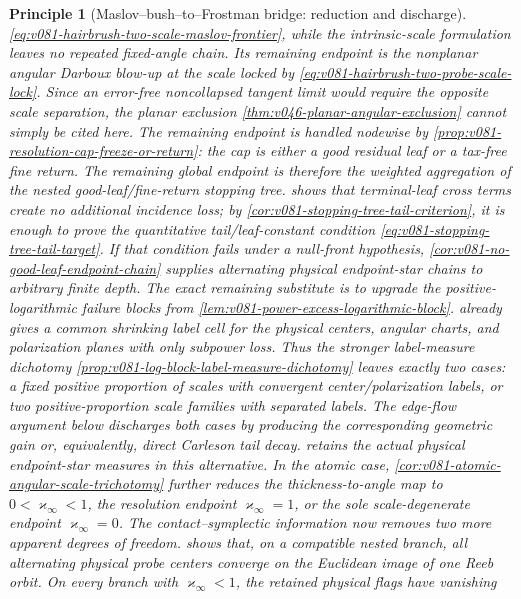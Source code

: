 \documentclass[10pt]{article}
\newtheorem{principle}[theorem]{Principle}
\begin{document}
\begin{principle}[Maslov--bush--to--Frostman bridge: reduction and discharge]
\eqref{eq:v081-hairbrush-two-scale-maslov-frontier}, while the intrinsic-scale formulation leaves
no repeated fixed-angle chain.  Its remaining endpoint is the nonplanar angular Darboux blow-up at
the scale locked by \eqref{eq:v081-hairbrush-two-probe-scale-lock}.  Since an error-free
noncollapsed tangent limit would require the opposite scale separation, the planar exclusion
\cref{thm:v046-planar-angular-exclusion} cannot simply be cited here.  The remaining endpoint is
handled nodewise by \cref{prop:v081-resolution-cap-freeze-or-return}: the cap is either a good
residual leaf or a tax-free fine return.  The remaining global endpoint is therefore the weighted
aggregation of the nested good-leaf/fine-return stopping tree.   shows that terminal-leaf cross terms create no
additional incidence loss; by \cref{cor:v081-stopping-tree-tail-criterion}, it is enough to prove
the quantitative tail/leaf-constant condition
\eqref{eq:v081-stopping-tree-tail-target}.  If that condition fails under a null-front
hypothesis, \cref{cor:v081-no-good-leaf-endpoint-chain} supplies alternating physical
endpoint-star chains to arbitrary finite depth.  The exact remaining substitute is to upgrade
the positive-logarithmic failure blocks from
\cref{lem:v081-power-excess-logarithmic-block}.   already gives a common shrinking label cell for
the physical centers, angular charts, and polarization planes with only subpower loss.  Thus the
stronger label-measure dichotomy
\cref{prop:v081-log-block-label-measure-dichotomy} leaves exactly two cases: a fixed positive
proportion of scales with convergent center/polarization labels, or two positive-proportion scale
families with separated labels.  The edge-flow argument below discharges both cases by producing the corresponding geometric gain or, equivalently, direct Carleson tail decay.   retains the actual physical endpoint-star
measures in this alternative.  In the atomic case,
\cref{cor:v081-atomic-angular-scale-trichotomy} further reduces the thickness-to-angle map to
\(0<\varkappa_\infty<1\), the resolution endpoint \(\varkappa_\infty=1\), or the sole scale-degenerate
endpoint \(\varkappa_\infty=0\).  The contact--symplectic information now removes two more apparent
degrees of freedom.   shows that, on a compatible
nested branch, all alternating physical probe centers converge on the Euclidean image of one Reeb
orbit.  On every branch with \(\varkappa_\infty<1\), the retained physical flags have vanishing

\end{principle}
\end{document}
